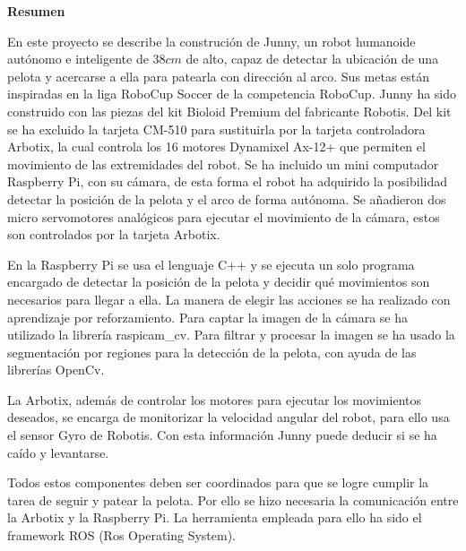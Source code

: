 \setcounter{page}{4}
\begin{center}
	{\bf Resumen}  %
\end{center}	


En este proyecto se describe la construción de Junny, un robot humanoide autónomo e inteligente de $38 cm $ de alto, capaz de detectar la ubicación de una pelota y acercarse a ella para patearla con dirección al arco. Sus metas están inspiradas en la liga RoboCup Soccer de la competencia RoboCup.
Junny ha sido construido con las piezas del kit Bioloid Premium del fabricante Robotis. Del kit se ha excluido la tarjeta CM-510 para sustituirla por la tarjeta controladora Arbotix, la cual controla los 16 motores Dynamixel Ax-12+ que permiten el movimiento de las extremidades del robot. Se ha incluido un mini computador Raspberry Pi, con su cámara, %
de esta forma el robot ha adquirido la posibilidad detectar la posición de la pelota y el arco de forma autónoma. Se añadieron dos micro servomotores analógicos para ejecutar el movimiento de la c\'amara, estos son controlados por la tarjeta Arbotix. 

En la Raspberry Pi se usa el lenguaje \gls{C++} y se ejecuta un solo programa encargado de detectar la posición de la pelota y decidir qué movimientos son necesarios para llegar a ella. La manera de elegir las acciones se ha realizado con aprendizaje por reforzamiento. Para captar la imagen de la cámara se ha utilizado la librería raspicam\_cv. Para filtrar y procesar la imagen se ha usado la segmentaci\'on por regiones para la detecci\'on de la pelota, con ayuda de las librerías OpenCv. %

La Arbotix, además de controlar los motores para ejecutar los movimientos deseados, se encarga de monitorizar la velocidad angular del robot, para ello usa el sensor Gyro de Robotis. Con esta información Junny puede deducir si se ha caído y levantarse. 

Todos estos componentes deben ser coordinados para que se logre cumplir la tarea de seguir y patear la pelota. Por ello se hizo necesaria la comunicación entre la Arbotix y la Raspberry Pi. La herramienta 
empleada para ello ha sido el \gls{framework} \gls{ROS} (Ros Operating System). %

